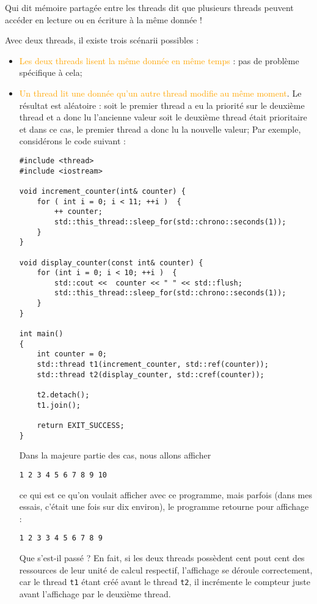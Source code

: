 \documentclass[fleqn,11pt]{article}
\begin{document}
Qui dit mémoire partagée entre les threads dit que plusieurs threads peuvent accéder
en lecture ou en écriture à la même donnée !

Avec deux threads, il existe trois scénarii possibles :
\begin{itemize}
\item \textcolor{orange}{Les deux threads lisent la même donnée en même temps} : pas de problème spécifique
à cela;
\item \textcolor{orange}{Un thread lit une donnée qu'un autre thread modifie au même moment}.  Le résultat est aléatoire :
soit le premier thread a eu la priorité sur le deuxième thread et a donc lu l'ancienne valeur soit
le deuxième thread était prioritaire et dans ce cas, le premier thread a donc lu la nouvelle valeur;
Par exemple, considérons le code suivant :
\begin{lstlisting}
#include <thread>
#include <iostream>

void increment_counter(int& counter) {
    for ( int i = 0; i < 11; ++i )  {
        ++ counter;
        std::this_thread::sleep_for(std::chrono::seconds(1));
    }
}

void display_counter(const int& counter) {
    for (int i = 0; i < 10; ++i )  {
        std::cout <<  counter << " " << std::flush;
        std::this_thread::sleep_for(std::chrono::seconds(1));        
    }
}

int main()
{
    int counter = 0;
    std::thread t1(increment_counter, std::ref(counter));
    std::thread t2(display_counter, std::cref(counter));

    t2.detach();
    t1.join();

    return EXIT_SUCCESS;
}
\end{lstlisting}
Dans la majeure partie des cas, nous allons afficher 
\begin{verbatim}
1 2 3 4 5 6 7 8 9 10
\end{verbatim}
ce qui est ce qu'on voulait afficher avec ce programme,
mais parfois (dans mes essais, c'était une fois sur dix environ), le programme retourne pour affichage :
\begin{verbatim}
1 2 3 3 4 5 6 7 8 9
\end{verbatim}

Que s'est-il passé ? En fait, si les deux threads possèdent cent pout cent des ressources de leur unité de calcul respectif, l'affichage se déroule correctement, car le thread \texttt{t1} étant créé avant le thread
\texttt{t2}, il incrémente le compteur juste avant l'affichage par le deuxième thread.


\end{itemize}
\end{document}
